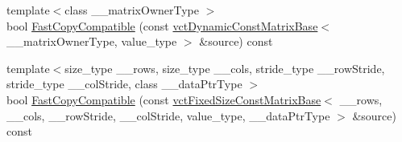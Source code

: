 {\bf }\par
\begin{DoxyCompactItemize}
\item 
{\footnotesize template$<$class \-\_\-\-\_\-matrix\-Owner\-Type $>$ }\\bool \hyperlink{classvct_dynamic_const_matrix_base_ad9551ca1ece96b5e9512f8407cee3537}{Fast\-Copy\-Compatible} (const \hyperlink{classvct_dynamic_const_matrix_base}{vct\-Dynamic\-Const\-Matrix\-Base}$<$ \-\_\-\-\_\-matrix\-Owner\-Type, value\-\_\-type $>$ \&source) const 
\item 
{\footnotesize template$<$size\-\_\-type \-\_\-\-\_\-rows, size\-\_\-type \-\_\-\-\_\-cols, stride\-\_\-type \-\_\-\-\_\-row\-Stride, stride\-\_\-type \-\_\-\-\_\-col\-Stride, class \-\_\-\-\_\-data\-Ptr\-Type $>$ }\\bool \hyperlink{classvct_dynamic_const_matrix_base_a609bdc3122a3dfd1d4b71ec4af7a666b}{Fast\-Copy\-Compatible} (const \hyperlink{classvct_fixed_size_const_matrix_base}{vct\-Fixed\-Size\-Const\-Matrix\-Base}$<$ \-\_\-\-\_\-rows, \-\_\-\-\_\-cols, \-\_\-\-\_\-row\-Stride, \-\_\-\-\_\-col\-Stride, value\-\_\-type, \-\_\-\-\_\-data\-Ptr\-Type $>$ \&source) const 
\end{DoxyCompactItemize}


